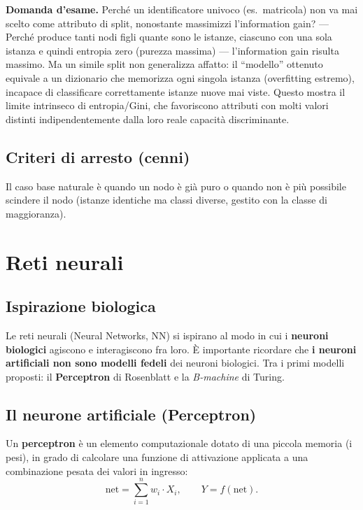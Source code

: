 \documentclass[11pt,a4paper]{report}
\newcommand{\domandaesame}[1]{\begin{esame}\textbf{Domanda d'esame.} #1\end{esame}}
\begin{document}
\domandaesame{Perché un identificatore univoco (es.\ matricola) non va mai scelto come attributo di split, nonostante massimizzi l'information gain? --- Perché produce tanti nodi figli quante sono le istanze, ciascuno con una sola istanza e quindi entropia zero (purezza massima) --- l'information gain risulta massimo. Ma un simile split non generalizza affatto: il ``modello'' ottenuto equivale a un dizionario che memorizza ogni singola istanza (overfitting estremo), incapace di classificare correttamente istanze nuove mai viste. Questo mostra il limite intrinseco di entropia/Gini, che favoriscono attributi con molti valori distinti indipendentemente dalla loro reale capacità discriminante.}

\subsection*{Criteri di arresto (cenni)}

Il caso base naturale è quando un nodo è già puro o quando non è più possibile scindere il nodo (istanze identiche ma classi diverse, gestito con la classe di maggioranza).

\section{Reti neurali}

\subsection*{Ispirazione biologica}

Le reti neurali (Neural Networks, NN) si ispirano al modo in cui i \textbf{neuroni biologici} agiscono e interagiscono fra loro. È importante ricordare che \textbf{i neuroni artificiali non sono modelli fedeli} dei neuroni biologici. Tra i primi modelli proposti: il \textbf{Perceptron} di Rosenblatt e la \emph{B-machine} di Turing.

\subsection*{Il neurone artificiale (Perceptron)}

Un \textbf{perceptron} è un elemento computazionale dotato di una piccola memoria (i pesi), in grado di calcolare una funzione di attivazione applicata a una combinazione pesata dei valori in ingresso:
\[
\text{net} = \sum_{i=1}^{n} w_i \cdot X_i, \qquad Y = f(\text{net}).
\]
\end{document}
